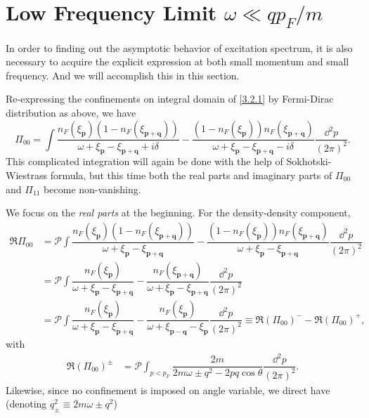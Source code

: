 \documentclass[bachelor,english,numbers]{ustcthesis}
\begin{document}
	\section{Low Frequency Limit $\omega\ll qp_F/m$}
		\indent\par In order to finding out the asymptotic behavior of excitation spectrum, it is also necessary to acquire the explicit expression at both small momentum and small frequency. And we will accomplish this in this section.\par
		Re-expressing the confinements on integral domain of \eqref{3.2.1} by Fermi-Dirac distribution as above, we have
		\begin{equation}\label{3.2.4}
			\Pi_{00}=\int\dfrac{n_F(\xi_{\bm{p}})(1-n_F(\xi_{\bm{p+q}}))}{\omega+\xi_{\bm{p}}-\xi_{\bm{p+q}}+i\delta}-\dfrac{(1-n_F(\xi_{\bm{p}}))n_F(\xi_{\bm{p+q}})}{\omega+\xi_{\bm{p}}-\xi_{\bm{p+q}}-i\delta}\dfrac{\dd^2 p}{(2\pi)^2}.
		\end{equation}
		This complicated integration will again be done with the help of Sokhotski-Wiestrass formula, but this time both the real parts and imaginary parts of $\Pi_{00}$ and $\Pi_{11}$ become non-vanishing.\par
		We focus on the \emph{real parts} at the beginning. For the density-density component,
		\begin{align}
			\Re \Pi_{00}&=\mathcal{P}\int\dfrac{n_F(\xi_{\bm{p}})(1-n_F(\xi_{\bm{p+q}}))}{\omega+\xi_{\bm{p}}-\xi_{\bm{p+q}}}-\dfrac{(1-n_F(\xi_{\bm{p}}))n_F(\xi_{\bm{p+q}})}{\omega+\xi_{\bm{p}}-\xi_{\bm{p+q}}}\dfrac{\dd^2 p}{(2\pi)^2}\nonumber\\
			&=\mathcal{P}\int\dfrac{n_F(\xi_{\bm{p}})}{\omega+\xi_{\bm{p}}-\xi_{\bm{p+q}}}-\dfrac{n_F(\xi_{\bm{p+q}})}{\omega+\xi_{\bm{p}}-\xi_{\bm{p+q}}}\dfrac{\dd^2 p}{(2\pi)^2}\nonumber\\
			&=\mathcal{P}\int\dfrac{n_F(\xi_{\bm{p}})}{\omega+\xi_{\bm{p}}-\xi_{\bm{p+q}}}-\dfrac{n_F(\xi_{\bm{p}})}{\omega+\xi_{\bm{p-q}}-\xi_{\bm{p}}}\dfrac{\dd^2 p}{(2\pi)^2}\equiv\Re (\Pi_{00})^{-}-\Re(\Pi_{00})^+,\label{3.2.5}
		\end{align}
		with
		\begin{align*}
			\Re (\Pi_{00})^{\pm}&=\mathcal{P}\int_{p<p_F}\dfrac{2m}{2m\omega\pm q^2-2pq\cos\theta}\dfrac{\dd^2p}{(2\pi)^2}.
		\end{align*}
		Likewise, since no confinement is imposed on angle variable, we direct have (denoting $q^2_{\pm}\equiv 2m\omega\pm q^2$)
\end{document}
